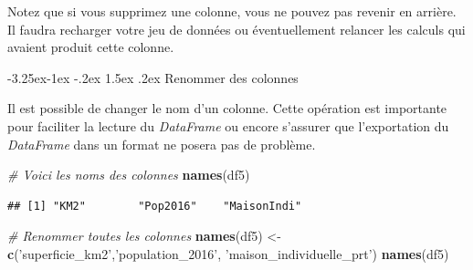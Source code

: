 \documentclass[
  11pt,
  french,
]{book}
\makeatletter
\newenvironment{Shaded}{\begin{snugshade}}{\end{snugshade}}
\newcommand{\CommentTok}[1]{\textcolor[rgb]{0.56,0.35,0.01}{\textit{#1}}}
\newcommand{\DecValTok}[1]{\textcolor[rgb]{0.00,0.00,0.81}{#1}}
\newcommand{\KeywordTok}[1]{\textcolor[rgb]{0.13,0.29,0.53}{\textbf{#1}}}
\newcommand{\NormalTok}[1]{#1}
\newcommand{\OperatorTok}[1]{\textcolor[rgb]{0.81,0.36,0.00}{\textbf{#1}}}
\newcommand{\OtherTok}[1]{\textcolor[rgb]{0.56,0.35,0.01}{#1}}
\newcommand{\StringTok}[1]{\textcolor[rgb]{0.31,0.60,0.02}{#1}}
\newenvironment{kframe}{%
\medskip{}
\setlength{\fboxsep}{.8em}
 \def\at@end@of@kframe{}%
 \ifinner\ifhmode%
  \def\at@end@of@kframe{\end{minipage}}%
  \begin{minipage}{\columnwidth}%
 \fi\fi%
 \def\FrameCommand##1{\hskip\@totalleftmargin \hskip-\fboxsep
 \colorbox{shadecolor}{##1}\hskip-\fboxsep
     \hskip-\linewidth \hskip-\@totalleftmargin \hskip\columnwidth}%
 \MakeFramed {\advance\hsize-\width
   \@totalleftmargin\z@ \linewidth\hsize
   \@setminipage}}%
 {\par\unskip\endMakeFramed%
 \at@end@of@kframe}
\renewenvironment{Shaded}{\begin{kframe}}{\end{kframe}}
\renewcommand\paragraph{\@startsection{paragraph}{4}{\z@}%
   {-3.25ex\@plus -1ex \@minus -.2ex}%
   {1.5ex \@plus .2ex}%
   {\normalfont\normalsize\bfseries}}
\makeatother
\begin{document}
\begin{Shaded}
\end{Shaded}

Notez que si vous supprimez une colonne, vous ne pouvez pas revenir en arrière. Il faudra recharger votre jeu de données ou éventuellement relancer les calculs qui avaient produit cette colonne.

\hypertarget{sect014224}{%
\paragraph{Renommer des colonnes}\label{sect014224}}

Il est possible de changer le nom d'un colonne. Cette opération est importante pour faciliter la lecture du \emph{DataFrame} ou encore s'assurer que l'exportation du \emph{DataFrame} dans un format ne posera pas de problème.

\begin{Shaded}
\begin{Highlighting}[]
\CommentTok{# Voici les noms des colonnes}
\KeywordTok{names}\NormalTok{(df5)}
\end{Highlighting}
\end{Shaded}

\begin{verbatim}
## [1] "KM2"        "Pop2016"    "MaisonIndi"
\end{verbatim}

\begin{Shaded}
\begin{Highlighting}[]
\CommentTok{# Renommer toutes les colonnes}
\KeywordTok{names}\NormalTok{(df5) <-}\StringTok{ }\KeywordTok{c}\NormalTok{(}\StringTok{'superficie_km2'}\NormalTok{,}\StringTok{'population_2016'}\NormalTok{, }\StringTok{'maison_individuelle_prt'}\NormalTok{)}
\KeywordTok{names}\NormalTok{(df5)}
\end{Highlighting}
\end{Shaded}
\end{document}
